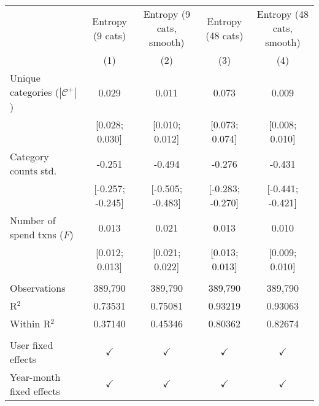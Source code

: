 
\begingroup
\centering
\begin{tabular}{lcccc}
   \toprule
                                          & Entropy (9 cats) & Entropy (9 cats, smooth) & Entropy (48 cats) & Entropy (48 cats, smooth) \\   
                                          & (1)              & (2)                      & (3)               & (4)\\  
   \midrule 
   Unique categories ($|\mathcal{C}^+|$)  & 0.029            & 0.011                    & 0.073             & 0.009\\   
                                          & [0.028; 0.030]   & [0.010; 0.012]           & [0.073; 0.074]    & [0.008; 0.010]\\   
   Category counts std.                   & -0.251           & -0.494                   & -0.276            & -0.431\\   
                                          & [-0.257; -0.245] & [-0.505; -0.483]         & [-0.283; -0.270]  & [-0.441; -0.421]\\   
   Number of spend txns ($F$)             & 0.013            & 0.021                    & 0.013             & 0.010\\   
                                          & [0.012; 0.013]   & [0.021; 0.022]           & [0.013; 0.013]    & [0.009; 0.010]\\   
    \\
   Observations                           & 389,790          & 389,790                  & 389,790           & 389,790\\  
   R$^2$                                  & 0.73531          & 0.75081                  & 0.93219           & 0.93063\\  
   Within R$^2$                           & 0.37140          & 0.45346                  & 0.80362           & 0.82674\\  
    \\
   User fixed effects                     & $\checkmark$     & $\checkmark$             & $\checkmark$      & $\checkmark$\\   
   Year-month fixed effects               & $\checkmark$     & $\checkmark$             & $\checkmark$      & $\checkmark$\\   
   \bottomrule
\end{tabular}
\par\endgroup


